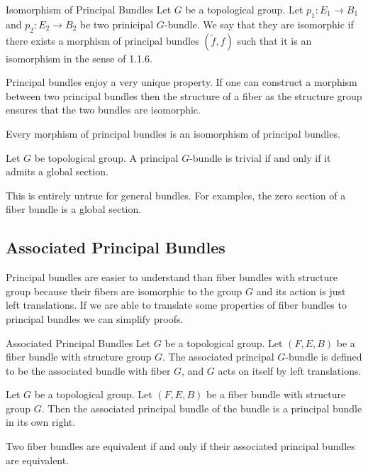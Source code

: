 \documentclass[a4paper]{article}
\begin{document}
\begin{defn}{Isomorphism of Principal Bundles}{} Let $G$ be a topological group. Let $p_1:E_1\to B_1$ and $p_2:E_2\to B_2$ be two prinicipal $G$-bundle. We say that they are isomorphic if there exists a morphism of principal bundles $(\tilde{f},f)$ such that it is an isomorphism in the sense of 1.1.6. 
\end{defn}

Principal bundles enjoy a very unique property. If one can construct a morphism between two principal bundles then the structure of a fiber as the structure group ensures that the two bundles are isomorphic. 

\begin{prp}{}{} Every morphism of principal bundles is an isomorphism of principal bundles. 
\end{prp}

\begin{thm}{}{} Let $G$ be topological group. A principal $G$-bundle is trivial if and only if it admits a global section. 
\end{thm}

This is entirely untrue for general bundles. For examples, the zero section of a fiber bundle is a global section. 

\subsection{Associated Principal Bundles}
Principal bundles are easier to understand than fiber bundles with structure group because their fibers are isomorphic to the group $G$ and its action is just left translations. If we are able to translate some properties of fiber bundles to principal bundles we can simplify proofs. 

\begin{defn}{Associated Principal Bundles}{} Let $G$ be a topological group. Let $(F,E,B)$ be a fiber bundle with structure group $G$. The associated principal $G$-bundle is defined to be the associated bundle with fiber $G$, and $G$ acts on itself by left translations. 
\end{defn}

\begin{prp}{}{} Let $G$ be a topological group. Let $(F,E,B)$ be a fiber bundle with structure group $G$. Then the associated principal bundle of the bundle is a principal bundle in its own right. 
\end{prp}

\begin{thm}{}{} Two fiber bundles are equivalent if and only if their associated principal bundles are equivalent. 
\end{thm}
\end{document}
